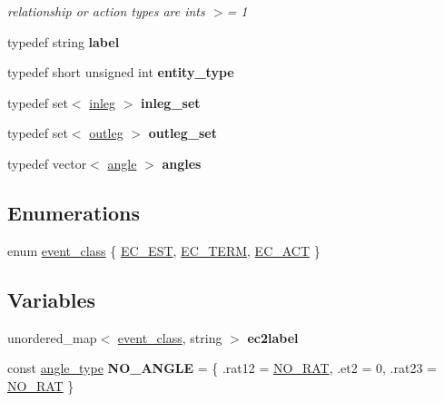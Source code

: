 \begin{DoxyCompactItemize}
\begin{DoxyCompactList}\small\item\em relationship or action types are ints $>$= 1 \end{DoxyCompactList}\item 
\mbox{\label{namespacetricl_a77e7daffafa870e5786b344119da9b15}} 
typedef string {\bfseries label}
\item 
\mbox{\label{namespacetricl_afd4de3aedd5e48cf955f03457386e98f}} 
typedef short unsigned int {\bfseries entity\+\_\+type}
\item 
\mbox{\label{namespacetricl_a703ed53fa2dba74d8f51ede5fd46038d}} 
typedef set$<$ \hyperlink{structtricl_1_1inleg}{inleg} $>$ {\bfseries inleg\+\_\+set}
\item 
\mbox{\label{namespacetricl_ac36fc4606da3d7f9ffd1764942fe5940}} 
typedef set$<$ \hyperlink{structtricl_1_1outleg}{outleg} $>$ {\bfseries outleg\+\_\+set}
\item 
\mbox{\label{namespacetricl_a4ec9b46d6dae5a1d114387bca4029ce5}} 
typedef vector$<$ \hyperlink{structtricl_1_1angle}{angle} $>$ {\bfseries angles}
\end{DoxyCompactItemize}
\subsection*{Enumerations}
\begin{DoxyCompactItemize}
\item 
enum \hyperlink{namespacetricl_a6967089e2c0837f273d8cb5fd9f7e46d}{event\+\_\+class} \{ \hyperlink{namespacetricl_a6967089e2c0837f273d8cb5fd9f7e46da928305067790de15396de8fcc92b72b9}{E\+C\+\_\+\+E\+ST}, 
\hyperlink{namespacetricl_a6967089e2c0837f273d8cb5fd9f7e46da16f53be37a75a1cdfc726014c7f3810a}{E\+C\+\_\+\+T\+E\+RM}, 
\hyperlink{namespacetricl_a6967089e2c0837f273d8cb5fd9f7e46dac508c68c92ee059322cb644dd330bbcf}{E\+C\+\_\+\+A\+CT}
 \}
\end{DoxyCompactItemize}
\subsection*{Variables}
\begin{DoxyCompactItemize}
\item 
unordered\+\_\+map$<$ \hyperlink{namespacetricl_a6967089e2c0837f273d8cb5fd9f7e46d}{event\+\_\+class}, string $>$ {\bfseries ec2label}
\item 
\mbox{\label{namespacetricl_a1d25690adbc3921709bd3b3e16415713}} 
const \hyperlink{structtricl_1_1angle__type}{angle\+\_\+type} {\bfseries N\+O\+\_\+\+A\+N\+G\+LE} = \{ .rat12 = \hyperlink{data__model_8h_ae71ff63a5bdb6bfc09a18840c8df4e54}{N\+O\+\_\+\+R\+AT}, .et2 = 0, .rat23 = \hyperlink{data__model_8h_ae71ff63a5bdb6bfc09a18840c8df4e54}{N\+O\+\_\+\+R\+AT} \}
\end{DoxyCompactItemize}


